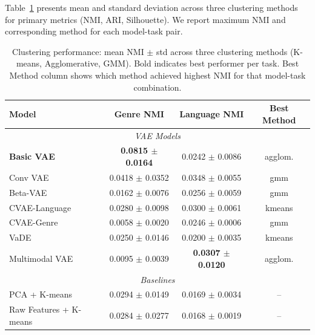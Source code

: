\documentclass[10pt,twocolumn]{article}
\begin{document}
Table~\ref{tab:clustering_results} presents mean and standard deviation across three clustering methods for primary metrics (NMI, ARI, Silhouette). We report maximum NMI and corresponding method for each model-task pair.

\begin{table}[t]
\centering
\caption{Clustering performance: mean NMI $\pm$ std across three clustering methods (K-means, Agglomerative, GMM). Bold indicates best performer per task. Best Method column shows which method achieved highest NMI for that model-task combination.}
\label{tab:clustering_results}
\small
\begin{tabular}{lccc}
\toprule
\textbf{Model} & \textbf{Genre NMI} & \textbf{Language NMI} & \textbf{Best Method} \\
\midrule
\multicolumn{4}{c}{\emph{VAE Models}} \\
\midrule
\textbf{Basic VAE} & \textbf{0.0815 $\pm$ 0.0164} & 0.0242 $\pm$ 0.0086 & agglom. \\
Conv VAE & 0.0418 $\pm$ 0.0352 & 0.0348 $\pm$ 0.0055 & gmm \\
Beta-VAE & 0.0162 $\pm$ 0.0076 & 0.0256 $\pm$ 0.0059 & gmm \\
CVAE-Language & 0.0280 $\pm$ 0.0098 & 0.0300 $\pm$ 0.0061 & kmeans \\
CVAE-Genre & 0.0058 $\pm$ 0.0020 & 0.0246 $\pm$ 0.0006 & gmm \\
VaDE & 0.0250 $\pm$ 0.0146 & 0.0200 $\pm$ 0.0035 & kmeans \\
Multimodal VAE & 0.0095 $\pm$ 0.0039 & \textbf{0.0307 $\pm$ 0.0120} & agglom. \\
\midrule
\multicolumn{4}{c}{\emph{Baselines}} \\
\midrule
PCA + K-means & 0.0294 $\pm$ 0.0149 & 0.0169 $\pm$ 0.0034 & -- \\
Raw Features + K-means & 0.0284 $\pm$ 0.0277 & 0.0168 $\pm$ 0.0019 & -- \\
\bottomrule
\end{tabular}
\end{table}
\end{document}
